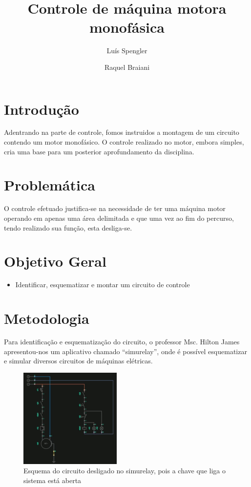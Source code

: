 \documentclass{article}
\title{Controle de máquina motora monofásica}
\date{}
\author[1]{Luís Spengler}
\author[2]{Raquel Braiani}
\affil[1,2]{Instituto Federal de Educação, Ciência e Tecnologia de Mato Grosso do Sul}
\begin{document}
\maketitle

\section{Introdução}
Adentrando na parte de controle, fomos instruidos a montagem de um circuito contendo um motor monofásico. O controle realizado no motor, embora simples, cria uma base para um posterior aprofundamento da disciplina.

\section{Problemática}
O controle efetuado justifica-se na necessidade de ter uma máquina motor operando em apenas uma área delimitada e que uma vez ao fim do percurso, tendo realizado sua função, esta desliga-se.

\section{Objetivo Geral}
\begin{itemize}
	\item Identificar, esquematizar e montar um circuito de controle
\end{itemize}

\section{Metodologia}
Para identificação e esquematização do circuito, o professor Msc. Hilton James apresentou-nos um aplicativo chamado ``simurelay'', onde é possível esquematizar e simular diversos circuitos de máquinas elétricas.

\begin{figure}[h!]
	\centering
        \includegraphics[width=0.45\textwidth]{simurelay}
	\caption{Esquema do circuito desligado no simurelay, pois a chave que liga o sistema está aberta}
\end{figure}
\end{document}
